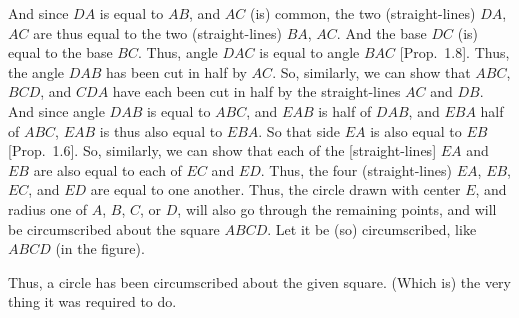 \begin{Parallel}{}{}
{And since $DA$ is equal to $AB$, and $AC$ (is) common, the two (straight-lines)
$DA$, $AC$ are thus equal to the two (straight-lines) $BA$, $AC$. And the base $DC$
(is) equal to the base $BC$. Thus, angle $DAC$ is equal to angle $BAC$ [Prop.~1.8]. Thus, the angle $DAB$ has been cut in half by $AC$. So, similarly,
we can show that $ABC$, $BCD$, and $CDA$ have each been cut in half
by the straight-lines $AC$ and $DB$. And since angle $DAB$ is equal
 to $ABC$, and $EAB$ is half of $DAB$, and $EBA$ half of $ABC$, $EAB$ is thus
 also equal to $EBA$. So that side $EA$ is also equal to  $EB$ [Prop.~1.6]. So, similarly, we can show that each of the [straight-lines] $EA$ and $EB$ are also equal to each of $EC$ and $ED$. Thus, the four (straight-lines)
 $EA$, $EB$, $EC$, and $ED$ are equal to one another. Thus, the circle drawn with
 center $E$, and radius one of $A$, $B$, $C$, or $D$, will also go through the remaining points, and will be circumscribed about the square $ABCD$. Let
 it be (so) circumscribed, like $ABCD$ (in the figure).
 
 Thus, a circle has been circumscribed about the given square.
 (Which is) the very thing it was required to do.}
\end{Parallel}

